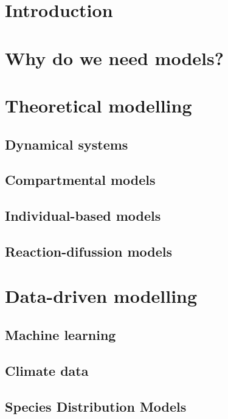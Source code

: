 \section{\label{sec:Introduction_2} Introduction}

\section{\label{sec:Why do we need models?} Why do we need models?}

\section{\label{sec:Theoretical modelling} Theoretical modelling}

\subsection{\label{sec:Dynamical systems} Dynamical systems}

\subsection{\label{sec:Compartmental models} Compartmental
  models}

\subsection{\label{sec:Individual-based models} Individual-based models}

\subsection{\label{sec:Reaction-diffusion models} Reaction-difussion models}

\section{\label{sec:Data-driven modelling} Data-driven modelling}

\subsection{\label{sec:Machine learning} Machine learning}

\subsection{\label{sec:Climate data} Climate data}

\subsection{\label{sec:Species Distribution Models} Species Distribution
  Models}